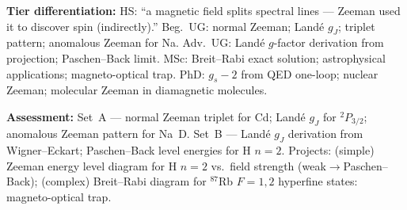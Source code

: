 \documentclass[11pt,a4paper]{article}
\begin{document}
\begin{tcolorbox}[modulebox, title={Module~I.4 / L06: Zeeman Effect}]
\medskip\textbf{Tier differentiation:}
HS: ``a magnetic field splits spectral lines --- Zeeman used it to discover spin (indirectly).''
Beg.\ UG: normal Zeeman; Land\'e $g_J$; triplet pattern; anomalous Zeeman for Na.
Adv.\ UG: Land\'e $g$-factor derivation from projection; Paschen--Back limit.
MSc: Breit--Rabi exact solution; astrophysical applications; magneto-optical trap.
PhD: $g_s-2$ from QED one-loop; nuclear Zeeman; molecular Zeeman in diamagnetic molecules.

\medskip\textbf{Assessment:}
Set~A --- normal Zeeman triplet for Cd; Land\'e $g_J$ for $^2P_{3/2}$; anomalous Zeeman pattern for Na~D.
Set~B --- Land\'e $g_J$ derivation from Wigner--Eckart; Paschen--Back level energies for H $n=2$.
Projects: (simple) Zeeman energy level diagram for H $n=2$ vs.\ field strength (weak$\to$Paschen--Back);
(complex) Breit--Rabi diagram for $^{87}$Rb $F=1,2$ hyperfine states: magneto-optical trap.
\end{tcolorbox}

\medskip
\end{document}
